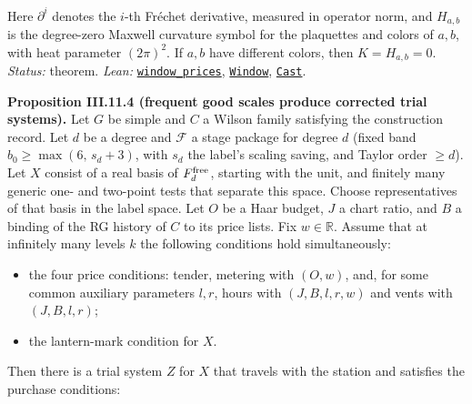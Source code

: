 \documentclass[
  letterpaper,
  11pt]{article}
\providecommand{\tightlist}{%
  \setlength{\itemsep}{0pt}\setlength{\parskip}{0pt}}
\begin{document}
Here \(\partial^i\) denotes the \(i\)-th Fréchet derivative, measured in
operator norm, and \(H_{a,b}\) is the degree-zero Maxwell curvature
symbol for the plaquettes and colors of \(a,b\), with heat parameter
\((2\pi)^2\). If \(a,b\) have different colors, then \(K=H_{a,b}=0\).
\emph{Status:} theorem. \emph{Lean:}
\href{https://github.com/yang-mills-group/OpenAI-YM-20261028/blob/3456e5e75cf8d4cd558955a5c7638fba2d68f464/YM/PhysicalNext/RANK_COVARIANCE_ATLAS/Window.lean\#L118-L136}{\texttt{window\_prices}},
\href{https://github.com/yang-mills-group/OpenAI-YM-20261028/blob/3456e5e75cf8d4cd558955a5c7638fba2d68f464/YM/Next/RANK/Radian/Signed.lean\#L47-L53}{\texttt{Window}},
\href{https://github.com/yang-mills-group/OpenAI-YM-20261028/blob/3456e5e75cf8d4cd558955a5c7638fba2d68f464/YM/Next/RANK/Radian/Means.lean\#L16-L19}{\texttt{Cast}}.

\textbf{Proposition III.11.4 (frequent good scales produce corrected
trial systems).} Let \(G\) be simple and \(C\) a Wilson family
satisfying the construction record. Let \(d\) be a degree and
\(\mathcal F\) a stage package for degree \(d\) (fixed band
\(b_0\ge\max(6,\,s_d+3)\), with \(s_d\) the label's scaling saving, and
Taylor order \(\ge d\)). Let \(X\) consist of a real basis of
\(F_d^{\rm free}\), starting with the unit, and finitely many generic
one- and two-point tests that separate this space. Choose
representatives of that basis in the label space. Let \(O\) be a Haar
budget, \(J\) a chart ratio, and \(B\) a binding of the RG history of
\(C\) to its price lists. Fix \(w\in\mathbb R\). Assume that at
infinitely many levels \(k\) the following conditions hold
simultaneously:

\begin{itemize}
\tightlist
\item
  the four price conditions: tender, metering with \((O,w)\), and, for
  some common auxiliary parameters \(l,r\), hours with \((J,B,l,r,w)\)
  and vents with \((J,B,l,r)\);
\item
  the lantern-mark condition for \(X\).
\end{itemize}

Then there is a trial system \(Z\) for \(X\) that travels with the
station and satisfies the purchase conditions:
\end{document}
